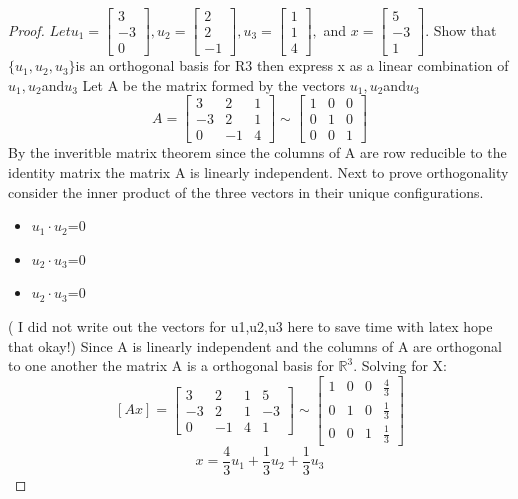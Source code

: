 \documentclass[12pt]{article}
\newcommand{\R}{\mathbb{R}}
\begin{document}
\begin{proof}$
 Letu_1=\begin{bmatrix}
   3\\-3\\0
 \end{bmatrix},u_2=\begin{bmatrix}
   2\\2\\-1
 \end{bmatrix},u_3=\begin{bmatrix}
   1\\1\\4
 \end{bmatrix},$ and $x=\begin{bmatrix}
   5\\-3\\1
 \end{bmatrix}.$  Show that$\{u_1,u_2,u_3\}$is an orthogonal basis for R3 then express x as a linear combination of $u_1,u_2$and$u_3$
 Let A be the matrix formed by the vectors $u_1,u_2$and$u_3$
 \[
   A =\begin{bmatrix}
     3&2&1\\-3&2&1\\0&-1&4
 \end{bmatrix}
 \sim \begin{bmatrix}
   1&0&0\\0&1&0\\0&0&1
 \end{bmatrix}
 \]
 By the inveritble matrix theorem since the columns of A are row reducible to the identity matrix the matrix A is linearly independent. Next to prove orthogonality consider the inner product of the three vectors in their unique configurations.
 \begin{itemize}
   \item $u_1 \cdot u_2$=0
   \item $u_2 \cdot u_3$=0
   \item $u_2 \cdot u_3$=0
 \end{itemize}
 ( I did not write out the vectors for u1,u2,u3 here to save time with latex hope that okay!)
 Since A is linearly independent and the columns of A are orthogonal to one another the matrix A is a orthogonal basis for $\R^3$. Solving for X:
 \[
 [A x] =\begin{bmatrix}
   3&2&1&5\\-3&2&1&-3\\0&-1&4&1
 \end{bmatrix}\sim \begin{bmatrix}
  1&0&0&\frac{4}{3}\\0&1&0&\frac{1}{3}\\0&0&1&\frac{1}{3}
 \end{bmatrix}
 \]
 \[
   x=\frac{4}{3}u_1+\frac{1}{3}u_2+\frac{1}{3}u_3
 \]
\end{proof}
\end{document}
